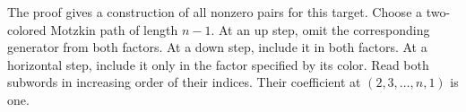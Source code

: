 \documentclass[11pt]{article}
\begin{document}
The proof gives a construction of all nonzero pairs for this target. Choose a two-colored Motzkin path of length $n-1$. At an up step, omit the corresponding generator from both factors. At a down step, include it in both factors. At a horizontal step, include it only in the factor specified by its color. Read both subwords in increasing order of their indices. Their coefficient at $(2,3,\ldots,n,1)$ is one.
\end{document}
